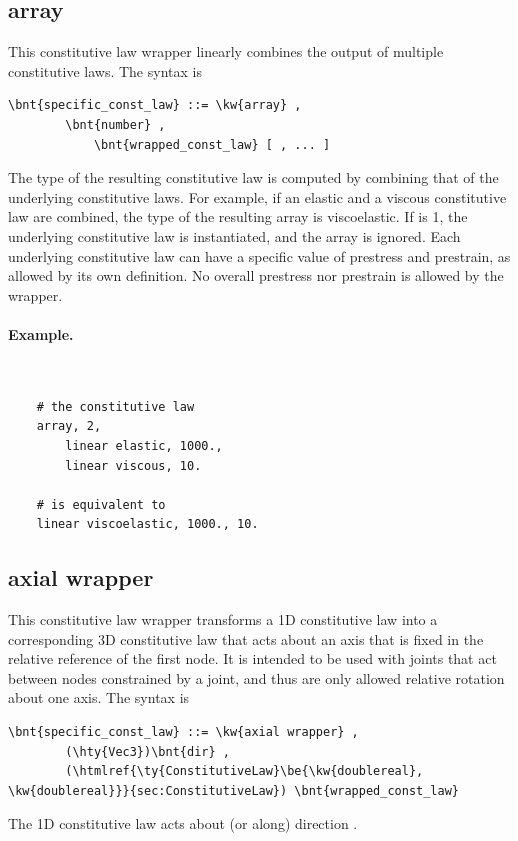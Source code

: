 \subsection{array}
This constitutive law wrapper linearly combines the output
of multiple constitutive laws.
The syntax is
\begin{Verbatim}[commandchars=\\\{\}]
    \bnt{specific_const_law} ::= \kw{array} ,
        \bnt{number} ,
            \bnt{wrapped_const_law} [ , ... ]
\end{Verbatim}
The type of the resulting constitutive law is computed by combining
that of the underlying constitutive laws.
For example, if an elastic and a viscous constitutive law are combined,
the type of the resulting array is viscoelastic.
If  is 1, the underlying constitutive law is instantiated,
and the array is ignored.
Each underlying constitutive law can have a specific value
of prestress and prestrain, as allowed by its own definition.
No overall prestress nor prestrain is allowed by the  wrapper.

\paragraph{Example.} \
\begin{verbatim}
    # the constitutive law
    array, 2,
        linear elastic, 1000.,
        linear viscous, 10.

    # is equivalent to
    linear viscoelastic, 1000., 10.
\end{verbatim}


\subsection{axial wrapper}
This constitutive law wrapper transforms a 1D constitutive law into a corresponding 3D constitutive law that acts about an axis that is fixed in the relative reference of the first node.  It is intended to be used with  joints that act between nodes constrained by a  joint, and thus are only allowed relative rotation about one axis.
The syntax is
\begin{Verbatim}[commandchars=\\\{\}]
    \bnt{specific_const_law} ::= \kw{axial wrapper} ,
        (\hty{Vec3})\bnt{dir} ,
        (\htmlref{\ty{ConstitutiveLaw}\be{\kw{doublereal}, \kw{doublereal}}}{sec:ConstitutiveLaw}) \bnt{wrapped_const_law}
\end{Verbatim}
The 1D constitutive law  acts about (or along) direction .

